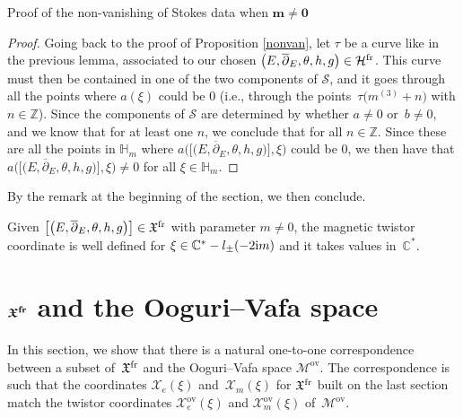 \begin{subsubsection}{Proof of the non-vanishing of Stokes data when $\boldsymbol{m\neq 0}$}
\begin{proof}
Going back to the proof of Proposition \ref{nonvan}, let $\tau$ be a curve like in the previous lemma, associated to our chosen $\bigl(E,\overline{\partial}_E,\theta,h,g\bigr) \in \mathcal{H}^{{\rm fr}}$. This curve must then be contained in one of the two components of $\mathcal{S}$, and it goes through all the points where $a(\xi)$ could be $0$ (i.e., through the points~${\tau\bigl(m^{(3)}+n\bigr)}$ with $n \in \mathbb{Z}$). Since the components of $\mathcal{S}$ are determined by whether $a\neq0$ or~${b\neq 0}$, and we know that  for at least one $n$, we conclude that  for all $n \in \mathbb{Z}$. Since these are all the points in $\mathbb{H}_m$ where $a\bigl(\bigl[\bigl(E,\overline{\partial}_E,\theta,h,g\bigr)\bigr],\xi\bigr)$ could be $0$, we then have that $a\bigl(\bigl[\bigl(E,\overline{\partial}_E,\theta,h,g\bigr)\bigr],\xi\bigr)\neq 0$ for all $\xi \in \mathbb{H}_m$.
\end{proof}

By the remark at the beginning of the section, we then conclude.
\begin{Corollary} Given $\bigl[\bigl(E,\overline{\partial}_E,\theta,h,g\bigr)\bigr] \in \mathfrak{X}^{{\rm fr}}$ with parameter $m\neq 0$, the magnetic twistor coordinate  is well defined for $\xi \in \mathbb{C}^*-l_{\pm}(-2{\rm i}m)$ and it takes values in~$\mathbb{C}^*$.
\end{Corollary}
\end{subsubsection}

\section[X\^{}\{fr\} and the Ooguri--Vafa space]{$\boldsymbol{\mathfrak{X}^{{\rm fr}}}$ and the Ooguri--Vafa space}\label{sec4}

In this section, we show that there is a natural one-to-one correspondence between a subset of~$\mathfrak{X}^{{\rm fr}}$ and the Ooguri--Vafa space $\mathcal{M}^{\text{ov}}$. The correspondence is such that the coordinates $\mathcal{X}_e(\xi)$ and~$\mathcal{X}_m(\xi)$ for $\mathfrak{X}^{{\rm fr}}$ built on the last section match the twistor coordinates $\mathcal{X}_e^{\text{ov}}(\xi)$ and $\mathcal{X}_m^{\text{ov}}(\xi)$ of~$\mathcal{M}^{\text{ov}}$.

